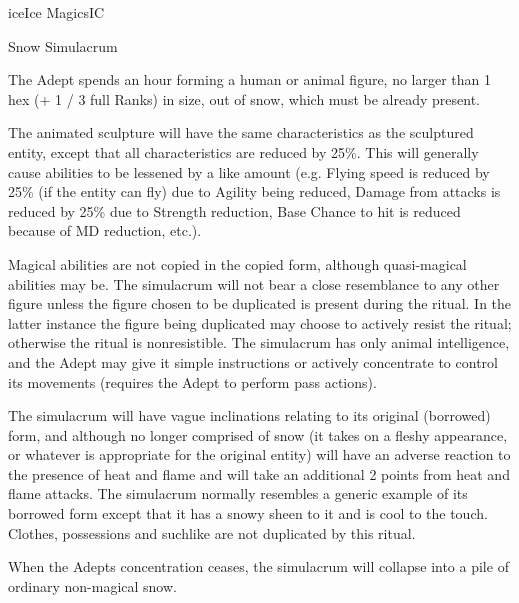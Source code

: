 \begin{College}[1.5]{ice}{Ice Magics}{IC}
\begin{ritual}[R-1]{Snow Simulacrum}
\begin{effects}
The Adept spends an hour forming a human or animal figure, no larger
than 1 hex (+ 1 / 3 full Ranks) in size, out of snow, which must be
already present.

The animated sculpture will have the same characteristics as the
sculptured entity, except that all characteristics are reduced by
25\%. This will generally cause abilities to be lessened by a like
amount (e.g.  Flying speed is reduced by 25\% (if the entity can fly)
due to Agility being reduced, Damage from attacks is reduced by 25\%
due to Strength reduction, Base Chance to hit is reduced because of MD
reduction, etc.).

Magical abilities are not copied in the copied form, although
quasi-magical abilities may be. The simulacrum will not bear a close
resemblance to any other figure unless the figure chosen to be
duplicated is present during the ritual.  In the latter instance the
figure being duplicated may choose to actively resist the ritual;
otherwise the ritual is nonresistible.  The simulacrum has only animal
intelligence, and the Adept may give it simple instructions or
actively concentrate to control its movements (requires the Adept to
perform pass actions).

The simulacrum will have vague inclinations relating to its original
(borrowed) form, and although no longer comprised of snow (it takes on
a fleshy appearance, or whatever is appropriate for the original
entity) will have an adverse reaction to the presence of heat and
flame and will take an additional 2 points from heat and flame
attacks.  The simulacrum normally resembles a generic example of its
borrowed form except that it has a snowy sheen to it and is cool to
the touch.  Clothes, possessions and suchlike are not duplicated by
this ritual.

When the Adepts concentration ceases, the simulacrum will collapse
into a pile of ordinary non-magical snow.
\end{effects}
\end{ritual}



\end{College}
